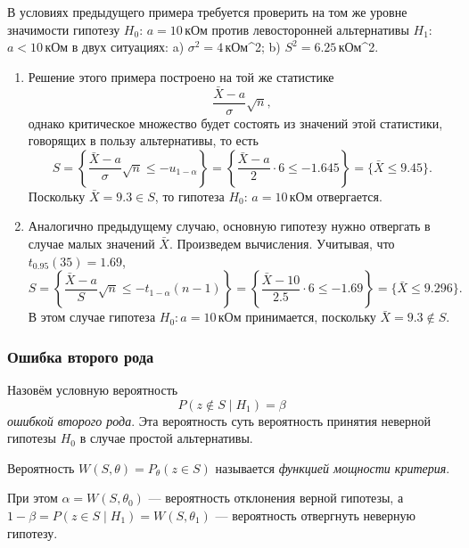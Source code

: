 \begin{ex}\label{ex:2}
	В условиях предыдущего примера требуется проверить на том же уровне значимости
	гипотезу $ H_0 $: $ a = 10 $\,кОм против левосторонней альтернативы $ H_1 $:
	$ a < 10 $\,кОм в двух ситуациях: a) $ \sigma^2 = 4 $\,кОм^2; b) $ S^2 = 6.25
	$\,кОм^2.
	\begin{solution}
		\begin{enumerate}[label=\alph*)]
			\item\label{enum:1} Решение этого примера  построено на той же статистике 
			\[
					\frac{\bar X - a}{\sigma}\sqrt n,
			\]
			однако критическое множество будет состоять из значений этой статистики,
			говорящих в пользу альтернативы, то есть 
			\[
				S = \left\{ \frac{\bar X - a}{\sigma}\sqrt n \leqslant - u_{1-\alpha}
				\right\} = \left\{ \frac{\bar X - a}{2} \cdot 6 \leqslant - 1.645
				\right\} = \{\bar X \leqslant 9.45 \}.
			\]
		Поскольку $ \bar X = 9.3 \in S $, то гипотеза $ H_0 $: $ a = 10 $\,кОм
		отвергается.	
	\item Аналогично предыдущему случаю, основную гипотезу нужно отвергать в случае малых 
		значений $\bar X$. Произведем вычисления. Учитывая, что $ t_{0.95}(35) = 1.69 $,
	\[
		S = \left\{ \frac{\bar X - a}{S}\sqrt n \leqslant -t_{1-\alpha}(n-1)
		\right\} = \left\{ \frac{\bar X - 10}{2.5}\cdot 6 \leqslant -1.69 \right\} =
		\{\bar X \leqslant 9.296\}.
	\]
	В этом случае гипотеза $ H_0: a = 10 $\,кОм принимается, поскольку $ \bar X =
	9.3 \notin S$.
		\end{enumerate}

	\end{solution}
\end{ex}

\subsubsection{Ошибка второго рода}
\begin{definition}
Назовём условную вероятность
\[
	P(z\notin S \mid H_1) = \beta
\]
\emph{ошибкой второго рода}. Эта вероятность суть вероятность принятия неверной
гипотезы $ H_0 $ в случае простой альтернативы.
\end{definition}

\begin{definition}
Вероятность $W(S, \theta) = P_\theta(z\in S)$ называется \emph{функцией мощности
критерия}.
\end{definition}

При этом $ \alpha = W(S, \theta_0) $ --- вероятность отклонения верной гипотезы,
а $ 1-\beta = P(z \in S \mid H_1) = W(S, \theta_1) $ --- вероятность отвергнуть
неверную гипотезу.

